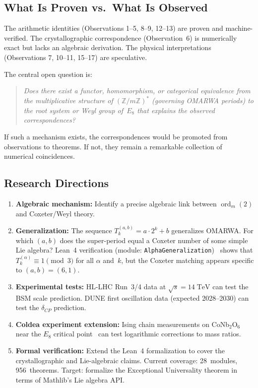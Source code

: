 \documentclass[11pt, a4paper]{article}
\theoremstyle{plain}
\theoremstyle{definition}
\theoremstyle{remark}
\newcommand{\ord}{\operatorname{ord}}
\begin{document}
\subsection{What Is Proven vs.\ What Is Observed}

The arithmetic identities (Observations 1--5, 8--9, 12--13) are
proven and machine-verified. The crystallographic correspondence
(Observation~6) is numerically exact but lacks an algebraic
derivation. The physical interpretations (Observations 7, 10--11,
15--17) are speculative.

The central open question is:

\begin{quote}
\textit{Does there exist a functor, homomorphism, or categorical
equivalence from the multiplicative structure of
$(\mathbb{Z}/m\mathbb{Z})^*$ (governing OMARWA periods) to the
root system or Weyl group of~$E_8$ that explains the observed
correspondences?}
\end{quote}

If such a mechanism exists, the correspondences would be promoted
from observations to theorems. If not, they remain a remarkable
collection of numerical coincidences.

\subsection{Research Directions}

\begin{enumerate}
  \item \textbf{Algebraic mechanism:} Identify a precise algebraic
    link between $\ord_m(2)$ and Coxeter/Weyl theory.

  \item \textbf{Generalization:} The sequence $T_k^{(a,b)} =
    a \cdot 2^k + b$ generalizes OMARWA. For which $(a,b)$ does
    the super-period equal a Coxeter number of some simple Lie
    algebra? Lean~4 verification (module:
    \texttt{AlphaGeneralization})~\cite{paket1} shows that
    $T_k^{(\alpha)} \equiv 1 \pmod{3}$ for all $\alpha$ and~$k$, but
    the Coxeter matching appears specific to $(a,b) = (6,1)$.

  \item \textbf{Experimental tests:} HL-LHC Run~3/4 data at
    $\sqrt{s} = 14\;\mathrm{TeV}$ can test the BSM scale
    prediction. DUNE first oscillation data (expected 2028--2030)
    can test the $\delta_{CP}$ prediction.

  \item \textbf{Coldea experiment extension:} Ising chain measurements
    on CoNb$_2$O$_6$ near the $E_8$ critical
    point~\cite{coldea} can test logarithmic corrections to mass ratios.

  \item \textbf{Formal verification:} Extend the Lean~4 formalization
    to cover the crystallographic and Lie-algebraic claims. Current
    coverage: 28~modules, 956~theorems. Target: formalize the
    Exceptional Universality theorem in terms of Mathlib's Lie
    algebra API.
\end{enumerate}
\end{document}
